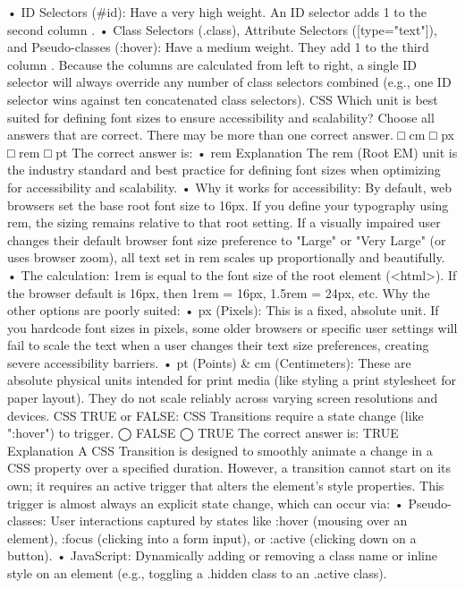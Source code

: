 •	ID Selectors (#id): Have a very high weight. An ID selector adds 1 to the second column .
•	Class Selectors (.class), Attribute Selectors ([type="text"]), and Pseudo-classes (:hover): Have a medium weight. They add 1 to the third column .
Because the columns are calculated from left to right, a single ID selector will always override any number of class selectors combined (e.g., one ID selector wins against ten concatenated class selectors).
CSS
Which unit is best suited for defining font sizes to ensure accessibility and scalability?
Choose all answers that are correct. There may be more than one correct answer.
□ cm
□ px
□ rem
□ pt
The correct answer is:
•	rem
Explanation
The rem (Root EM) unit is the industry standard and best practice for defining font sizes when optimizing for accessibility and scalability.
•	Why it works for accessibility: By default, web browsers set the base root font size to 16px. If you define your typography using rem, the sizing remains relative to that root setting. If a visually impaired user changes their default browser font size preference to "Large" or "Very Large" (or uses browser zoom), all text set in rem scales up proportionally and beautifully.
•	The calculation: 1rem is equal to the font size of the root element (<html>). If the browser default is 16px, then 1rem = 16px, 1.5rem = 24px, etc.
Why the other options are poorly suited:
•	px (Pixels): This is a fixed, absolute unit. If you hardcode font sizes in pixels, some older browsers or specific user settings will fail to scale the text when a user changes their text size preferences, creating severe accessibility barriers.
•	pt (Points) & cm (Centimeters): These are absolute physical units intended for print media (like styling a print stylesheet for paper layout). They do not scale reliably across varying screen resolutions and devices.
CSS
TRUE or FALSE: CSS Transitions require a state change (like ":hover") to trigger.
◯ FALSE
◯ TRUE
The correct answer is:
TRUE
Explanation
A CSS Transition is designed to smoothly animate a change in a CSS property over a specified duration. However, a transition cannot start on its own; it requires an active trigger that alters the element's style properties.
This trigger is almost always an explicit state change, which can occur via:
•	Pseudo-classes: User interactions captured by states like :hover (mousing over an element), :focus (clicking into a form input), or :active (clicking down on a button).
•	JavaScript: Dynamically adding or removing a class name or inline style on an element (e.g., toggling a .hidden class to an .active class).
